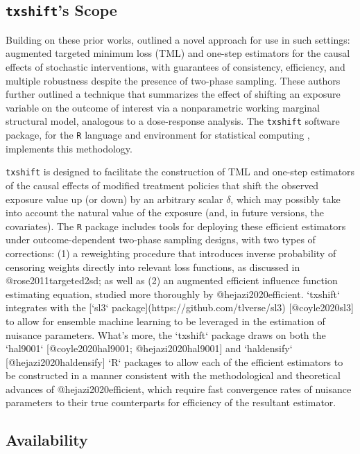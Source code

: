 \subsection{\texttt{txshift}'s Scope}

Building on these prior works, \citet{hejazi2020efficient} outlined a novel approach
for use in such settings: augmented targeted minimum loss (TML) and one-step
estimators for the causal effects of stochastic interventions, with guarantees
of consistency, efficiency, and multiple robustness despite the presence of
two-phase sampling. These authors further outlined a technique that summarizes
the effect of shifting an exposure variable on the outcome of interest via
a nonparametric working marginal structural model, analogous to a dose-response
analysis. The \texttt{txshift} software package, for the \texttt{R} language and environment
for statistical computing \citep{R}, implements this methodology.

\texttt{txshift} is designed to facilitate the construction of TML and one-step
estimators of the causal effects of modified treatment policies that shift the
observed exposure value up (or down) by an arbitrary scalar $\delta$, which may
possibly take into account the natural value of the exposure (and, in future
versions, the covariates). The \texttt{R} package includes tools for deploying these
efficient estimators under outcome-dependent two-phase sampling designs, with
two types of corrections: (1) a reweighting procedure that introduces inverse
probability of censoring weights directly into relevant loss functions, as
discussed in @rose2011targeted2sd; as well as (2) an augmented efficient
influence function estimating equation, studied more thoroughly by
@hejazi2020efficient. `txshift` integrates with the [`sl3`
package](https://github.com/tlverse/sl3) [@coyle2020sl3] to allow for ensemble
machine learning to be leveraged in the estimation of nuisance parameters.
What's more, the `txshift` package draws on both the `hal9001`
[@coyle2020hal9001; @hejazi2020hal9001] and `haldensify` [@hejazi2020haldensify]
`R` packages to allow each of the efficient estimators to be constructed in
a manner consistent with the methodological and theoretical advances of
@hejazi2020efficient, which require fast convergence rates of nuisance
parameters to their true counterparts for efficiency of the resultant estimator.

\subsection{Availability}

